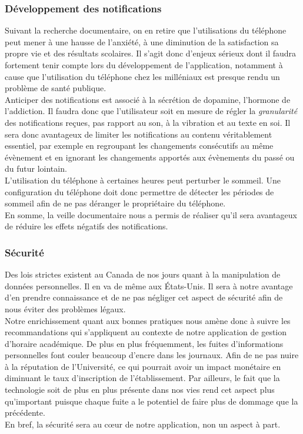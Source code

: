 		\subsubsection{Développement des notifications}

		Suivant la recherche documentaire, on en retire que l'utilisations du téléphone peut mener à une hausse de l'anxiété, à une diminution de la satisfaction sa propre vie et des résultats scolaires. Il s'agit donc d'enjeux sérieux dont il faudra fortement tenir compte lors du développement de l'application, notamment à cause que l'utilisation du téléphone chez les milléniaux est presque rendu un problème de santé publique. \\
		
		Anticiper des notifications est associé à la sécrétion de dopamine, l'hormone de l'addiction. Il faudra donc que l'utilisateur soit en mesure de régler la \emph{granularité} des notifications reçues, pas rapport au son, à la vibration et au texte en soi. Il sera donc avantageux de limiter les notifications au contenu véritablement essentiel, par exemple en regroupant les changements consécutifs au même évènement et en ignorant les changements apportés aux évènements du passé ou du futur lointain. \\
			
		L'utilisation du téléphone à certaines heures peut perturber le sommeil. Une configuration du téléphone doit donc permettre de détecter les périodes de sommeil afin de ne pas déranger le propriétaire du téléphone. \\
		
		En somme, la veille documentaire nous a permis de réaliser qu'il sera avantageux de réduire les effets négatifs des notifications.
	
		\subsubsection{Sécurité}
		Des lois strictes existent au Canada de nos jours quant à la manipulation de données personnelles. Il en va de même aux États-Unis. Il sera à notre avantage d'en prendre connaissance et de ne pas négliger cet aspect de sécurité afin de nous éviter des problèmes légaux. \\
		
		Notre enrichissement quant aux bonnes pratiques nous amène donc à suivre les recommandations qui s'appliquent au contexte de notre application de gestion d'horaire académique. De plus en plus fréquemment, les fuites d'informations personnelles font couler beaucoup d'encre dans les journaux. Afin de ne pas nuire à la réputation de l'Université, ce qui pourrait avoir un impact monétaire en diminuant le taux d'inscription de l'établissement. Par ailleurs, le fait que la technologie soit de plus en plus présente dans nos vies rend cet aspect plus qu'important puisque chaque fuite a le potentiel de faire plus de dommage que la précédente. \\
		
		En bref, la sécurité sera au c\oe ur de notre application, non un aspect à part. 
		
		
	
	
	
	
	
	
